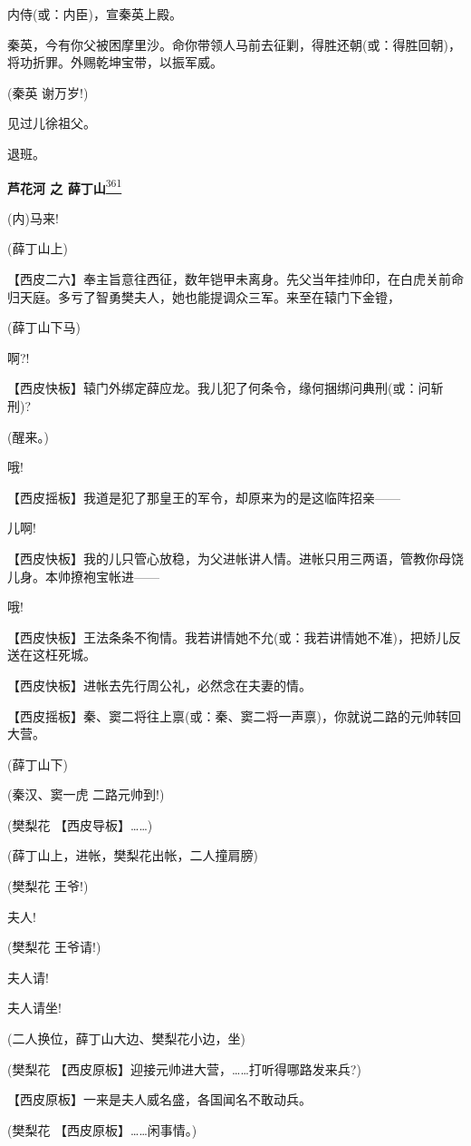 内侍(或：内臣)，宣秦英上殿。

秦英，今有你父被困摩里沙。命你带领人马前去征剿，得胜还朝(或：得胜回朝)，将功折罪。外赐乾坤宝带，以振军威。

(秦英 谢万岁!)

见过儿徐祖父。

退班。

\textbf{芦花河 之
薛丁山}\protect\hyperlink{fn361}{\textsuperscript{361}}

(内)马来!

(薛丁山上)

【西皮二六】奉主旨意往西征，数年铠甲未离身。先父当年挂帅印，在白虎关前命归天庭。多亏了智勇樊夫人，她也能提调众三军。来至在辕门下金镫，

(薛丁山下马)

啊?!

【西皮快板】辕门外绑定薛应龙。我儿犯了何条令，缘何捆绑问典刑(或：问斩刑)?

(醒来。)

哦!

【西皮摇板】我道是犯了那皇王的军令，却原来为的是这临阵招亲------

儿啊!

【西皮快板】我的儿只管心放稳，为父进帐讲人情。进帐只用三两语，管教你母饶儿身。本帅撩袍宝帐进------

哦!

【西皮快板】王法条条不徇情。我若讲情她不允(或：我若讲情她不准)，把娇儿反送在这枉死城。

【西皮快板】进帐去先行周公礼，必然念在夫妻的情。

【西皮摇板】秦、窦二将往上禀(或：秦、窦二将一声禀)，你就说二路的元帅转回大营。

(薛丁山下)

(秦汉、窦一虎 二路元帅到!)

(樊梨花 【西皮导板】\ldots{}\ldots{})

(薛丁山上，进帐，樊梨花出帐，二人撞肩膀)

(樊梨花 王爷!)

夫人!

(樊梨花 王爷请!)

夫人请!

夫人请坐!

(二人换位，薛丁山大边、樊梨花小边，坐)

(樊梨花 【西皮原板】迎接元帅进大营，\ldots{}\ldots{}打听得哪路发来兵?)

【西皮原板】一来是夫人威名盛，各国闻名不敢动兵。

(樊梨花 【西皮原板】\ldots{}\ldots{}闲事情。)


